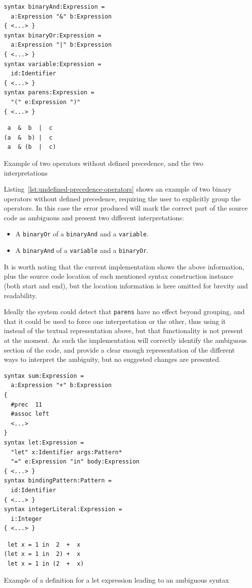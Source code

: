 \documentclass{kththesis}
\begin{document}
\begin{listing}[h]
\begin{verbatim}
syntax binaryAnd:Expression =
  a:Expression "&" b:Expression
{ <...> }
syntax binaryOr:Expression =
  a:Expression "|" b:Expression
{ <...> }
syntax variable:Expression =
  id:Identifier
{ <...> }
syntax parens:Expression =
  "(" e:Expression ")"
{ <...> }
\end{verbatim}
\begin{verbatim}
 a  &  b  |  c
(a  &  b) |  c
 a  & (b  |  c)
\end{verbatim}
\caption{Example of two operators without defined precedence, and the two interpretations}
\label{lst:undefined-precedence-operators}
\end{listing}

Listing~\ref{lst:undefined-precedence-operators} shows an example of two binary operators without defined precedence, requiring the user to explicitly group the operators. In this case the error produced will mark the correct part of the source code as ambiguous and present two different interpretations:

\begin{itemize}
  \item A \texttt{binaryOr} of a \texttt{binaryAnd} and a \texttt{variable}.
  \item A \texttt{binaryAnd} of a \texttt{variable} and a \texttt{binaryOr}.
\end{itemize}

It is worth noting that the current implementation shows the above information, plus the source code location of each mentioned syntax construction instance (both start and end), but the location information is here omitted for brevity and readability.

Ideally the system could detect that \texttt{parens} have no effect beyond grouping, and that it could be used to force one interpretation or the other, thus using it instead of the textual representation above, but that functionality is not present at the moment. As such the implementation will correctly identify the ambiguous section of the code, and provide a clear enough representation of the different ways to interpret the ambiguity, but no suggested changes are presented.

\begin{listing}[h]
\begin{verbatim}
syntax sum:Expression =
  a:Expression "+" b:Expression
{
  #prec  11
  #assoc left
  <...>
}
syntax let:Expression =
  "let" x:Identifier args:Pattern*
  "=" e:Expression "in" body:Expression
{ <...> }
syntax bindingPattern:Pattern =
  id:Identifier
{ <...> }
syntax integerLiteral:Expression =
  i:Integer
{ <...> }
\end{verbatim}
\begin{verbatim}
 let x = 1 in  2  +  x
(let x = 1 in  2) +  x
 let x = 1 in (2  +  x)
\end{verbatim}
\caption{Example of a definition for a let expression leading to an ambiguous syntax}
\label{lst:ambiguous-let-expr}
\end{listing}
\end{document}

